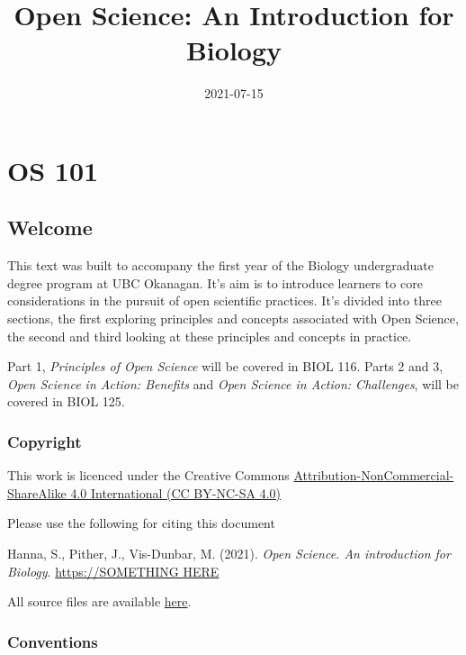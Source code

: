 \documentclass[
]{book}
\title{Open Science: An Introduction for Biology}
\author{}
\date{\vspace{-2.5em}2021-07-15}
\begin{document}
\maketitle

{
\setcounter{tocdepth}{1}
\tableofcontents
}
\hypertarget{part-os-101}{%
\part*{OS 101}\label{part-os-101}}

\hypertarget{welcome}{%
\chapter*{Welcome}\label{welcome}}

This text was built to accompany the first year of the Biology undergraduate degree program at UBC Okanagan. It's aim is to introduce learners to core considerations in the pursuit of open scientific practices. It's divided into three sections, the first exploring principles and concepts associated with Open Science, the second and third looking at these principles and concepts in practice.

Part 1, \emph{Principles of Open Science} will be covered in BIOL 116. Parts 2 and 3, \emph{Open Science in Action: Benefits} and \emph{Open Science in Action: Challenges}, will be covered in BIOL 125.

\hypertarget{copyright}{%
\section*{Copyright}\label{copyright}}

This work is licenced under the Creative Commons \href{https://creativecommons.org/licenses/by-nc-sa/4.0/}{Attribution-NonCommercial-ShareAlike 4.0 International (CC BY-NC-SA 4.0)}

Please use the following for citing this document

Hanna, S., Pither, J., Vis-Dunbar, M. (2021). \emph{Open Science. An introduction for Biology}. \href{}{https://SOMETHING HERE}

All source files are available \href{}{here}.

\hypertarget{conventions}{%
\section*{Conventions}\label{conventions}}
\end{document}
